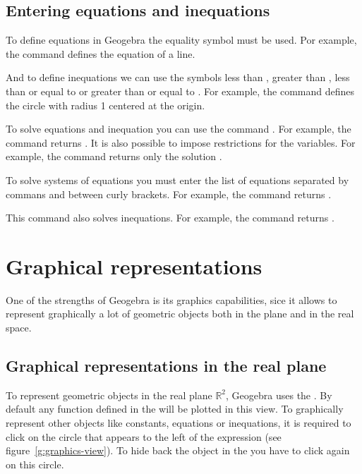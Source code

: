 \subsection*{Entering equations and inequations}
To define equations in Geogebra the equality symbol \command{=} must be used.
Por example, the command  defines the equation of a line.

And to define inequations we can use the symbols less than \command{<}, greater than \command{>}, less than or equal to \command{<=} or greater than or equal to \command{>=}.
For example, the command  defines the circle with radius 1 centered at the origin.

To solve equations and inequation you can use the command .
For example, the command  returns .
It is also possible to impose restrictions for the variables.
For example, the command  returns only the solution .

To solve systems of equations you must enter the list of equations separated by commans and between curly brackets.
For example, the command  returns .

This command also solves inequations.
For example, the command  returns .


\section{Graphical representations}
One of the strengths of Geogebra is its graphics capabilities, sice it allows to represent graphically a lot of geometric objects both in the plane and in the real space.


\subsection*{Graphical representations in the real plane}
To represent geometric objects in the real plane $\mathbb{R}^2$, Geogebra uses the .
By default any function defined in the  will be plotted in this view.
To graphically represent other objects like constants, equations or inequations, it is required to click on the circle that appears to the left of the expression (see figure~\ref{g:graphics-view}).
To hide back the object in the  you have to click again on this circle.

